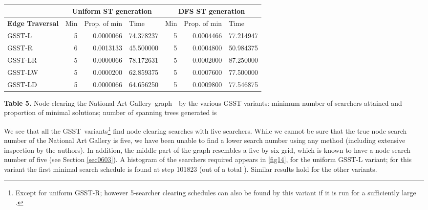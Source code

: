 \documentclass[11pt]{article}\usepackage{amsmath}
\begin{document}
\begin{center}\begin{tabular}
[c]{|l|l|l|l|l|l|l|}\hline
& \multicolumn{3}{|c}{\textbf{Uniform ST generation}} &
\multicolumn{3}{|c|}{\textbf{DFS ST generation}}\\\hline
\textbf{Edge Traversal} & Min & Prop. of min & Time & Min & Prop. of min &
Time\\\hline
GSST-L & \multicolumn{1}{|r|}{5} & \multicolumn{1}{|r|}{0.0000066} &
\multicolumn{1}{|r|}{74.378237} & \multicolumn{1}{|r|}{5} &
\multicolumn{1}{|r|}{0.0004466} & \multicolumn{1}{|r|}{77.214947}\\\hline
GSST-R & \multicolumn{1}{|r|}{6} & \multicolumn{1}{|r|}{0.0013133} &
\multicolumn{1}{|r|}{45.500000} & \multicolumn{1}{|r|}{5} &
\multicolumn{1}{|r|}{0.0004800} & \multicolumn{1}{|r|}{50.984375}\\\hline
GSST-LR & \multicolumn{1}{|r|}{5} & \multicolumn{1}{|r|}{0.0000066} &
\multicolumn{1}{|r|}{78.172631} & \multicolumn{1}{|r|}{5} &
\multicolumn{1}{|r|}{0.0002000} & \multicolumn{1}{|r|}{87.250000}\\\hline
GSST-LW & \multicolumn{1}{|r|}{5} & \multicolumn{1}{|r|}{0.0000200} &
\multicolumn{1}{|r|}{62.859375} & \multicolumn{1}{|r|}{5} &
\multicolumn{1}{|r|}{0.0007600} & \multicolumn{1}{|r|}{77.500000}\\\hline
GSST-LD & \multicolumn{1}{|r|}{5} & \multicolumn{1}{|r|}{0.0000066} &
\multicolumn{1}{|r|}{64.656250} & \multicolumn{1}{|r|}{5} &
\multicolumn{1}{|r|}{0.0009800} & \multicolumn{1}{|r|}{77.546875}\\\hline
\end{tabular}



\end{center}

\noindent\textbf{Table 5. }Node-clearing the National Art Gallery\ graph\ \ by
the various GSST variants: minimum number of searchers attained and proportion
of minimal solutions; number of spanning trees generated is 

\bigskip

We see that all the GSST\ variants\footnote{Except for uniform GSST-R; however
5-searcher clearing schedules can also be found by this variant if it is run
for a sufficiently large .} find node clearing searches with five
searchers. While we cannot be sure that the true node search number of the
National Art Gallery is five, we have been unable to find a lower search
number using any method (including extensive inspection by the authors). In
addition, the middle part of the graph resembles a five-by-six grid, which is
known to have a node search number of five (see Section \ref{sec0603}). A
histogram of the searchers required appears in \ref{fig14}, for the uniform
GSST-L variant; for this variant the first minimal search schedule is found at
step 101823 (out of a total ). Similar results hold for the
other variants.
\end{document}
